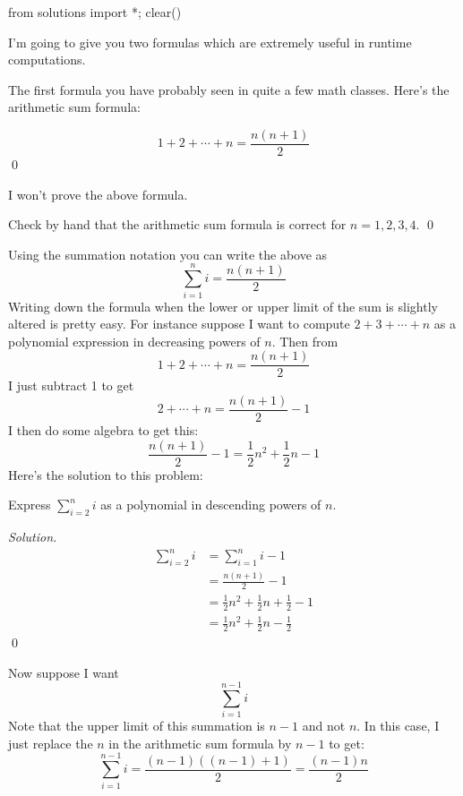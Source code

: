 \begin{python0}
from solutions import *; clear()
\end{python0}

I'm going to give you two formulas which are extremely 
useful in runtime computations.

The first formula
you have probably seen in quite a few math classes.
Here's the arithmetic sum formula:

\begin{prop}
\[
1 + 2 + \cdots + n = \frac{n(n+1)}{2}
\]
\qed
\end{prop}

I won't prove the above formula.

\begin{ex}
Check by hand that the arithmetic sum formula is correct
for $n = 1, 2, 3, 4$.
\qed
\end{ex}

Using the summation notation you can write the above as
\[
\sum_{i=1}^n i = \frac{n(n+1)}{2}
\]
Writing down the formula when the lower or upper limit of the sum
is slightly altered
is pretty easy.
For instance suppose I want to compute $2 + 3 + \cdots + n$
as a polynomial expression in decreasing powers of $n$.
Then from
\[
1 + 2 + \cdots + n = \frac{n(n+1)}{2}
\]
I just subtract 1 to get
\[
2 + \cdots + n = \frac{n(n+1)}{2} - 1 
\]
I then do some algebra to get this:
\[
\frac{n(n+1)}{2} - 1
= \frac{1}{2}n^2 + \frac{1}{2}n - 1
\]
Here's the solution to this problem:

\begin{eg}
Express $\sum_{i = 2}^n i$ as a polynomial in descending powers of $n$.
\end{eg}

\textit{Solution.}
\begin{align*}
\sum_{i=2}^n i
&= \sum_{i=1}^n i - 1 \\ 
&= \frac{n(n+1)}{2} - 1 \\ 
&= \frac{1}{2}n^2 + \frac{1}{2}n + \frac{1}{2} - 1 \\ 
&= \frac{1}{2}n^2 + \frac{1}{2}n - \frac{1}{2}
\end{align*} 
\qed

Now suppose I want 
\[
\sum_{i = 1}^{n - 1} i
\]
Note that the upper limit of this summation is $n - 1$ and not $n$.
In this case, I just replace the $n$ in the arithmetic sum
formula by $n - 1$ to get:
\[
\sum_{i = 1}^{n - 1} i
= \frac{(n - 1)((n - 1) + 1)}{2}
= \frac{(n - 1)n}{2}
\]

